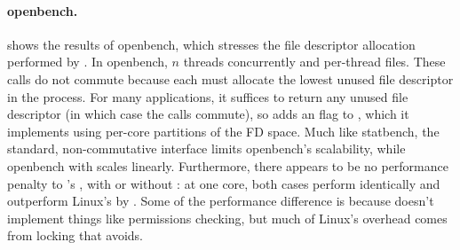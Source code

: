 \paragraph{openbench.}  shows the results
of openbench, which stresses the file descriptor allocation performed by
.  In openbench, $n$ threads concurrently  and
 per-thread files.  These calls do not commute because each
 must allocate the lowest unused file
descriptor in the process.  For many applications, it suffices to return
any unused file descriptor (in which case the  calls commute),
so \sys adds an  flag to , which it implements
using per-core partitions of the FD space.  Much like
statbench, the standard, non-commutative  interface limits
openbench's scalability, while openbench with  scales
linearly.  Furthermore, there appears to be no performance penalty to
\fs's , with or without : at one core, both
cases perform identically and outperform Linux's  by
.
Some of the performance difference is because \sys doesn't implement things like
permissions checking, but much of Linux's overhead comes from locking
that \fs avoids.

%   

